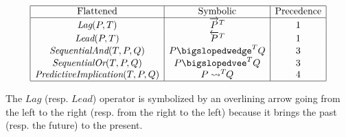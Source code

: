 \documentclass[runningheads]{llncs}
\newcommand{\SP}{\;\;\;}
\newcommand{\TEval}{\textit{Evaluation}}
\newcommand{\TList}{\textit{List}}
\newcommand{\TLamb}{\textit{Lambda}}
\newcommand{\TExec}{\textit{Execution}}
\newcommand{\TAtTime}{\textit{AtTime}}
\newcommand{\TAnd}{\textit{And}}
\newcommand{\TOr}{\textit{Or}}
\newcommand{\TImpl}{\textit{Implication}}
\newcommand{\TPredImpl}{\textit{PredictiveImplication}}
\newcommand{\TSeqAnd}{\textit{SequentialAnd}}
\newcommand{\TSeqOr}{\textit{SequentialOr}}
\newcommand{\TLag}{\textit{Lag}}
\newcommand{\TLead}{\textit{Lead}}
\newcommand{\TTV}{\textit{TV}}
\newcommand{\TBTV}{\langle \TTV \rangle}
\newcommand{\limp}{\rightarrow}
\newcommand{\lpreimp}[1]{\leadsto^{#1}}
\newcommand{\lseqor}[1]{\bigslopedvee^{#1}}
\newcommand{\lseqand}[1]{\bigslopedwedge^{#1}}
\newcommand{\ldo}[1]{\widehat{#1}}
\newcommand{\llag}[2]{\overrightarrow{#1}^{#2}}
\newcommand{\llead}[2]{\overleftarrow{#1}^{#2}}
\begin{document}
\renewcommand{\arraystretch}{1.5}
$$
\begin{array}{|c|c|c|}
  \hline
  \text{Flattened} & \text{Symbolic} & \text{Precedence} \\
  \hline
  \TLag(P, T) & \llag{P}{T} & 1 \\
  \TLead(P, T) & \llead{P}{T} & 1 \\
  \TSeqAnd(T, P, Q) & P \lseqand{T} Q & 3 \\
  \TSeqOr(T, P, Q) & P \lseqor{T} Q & 3 \\
  \TPredImpl(T, P, Q) & P \lpreimp{T} \! \! Q & 4 \\
  \hline
\end{array}
$$
\renewcommand{\arraystretch}{1}

The $\TLag$ (resp. $\TLead$) operator is symbolized by an overlining
arrow going from the left to the right (resp. from the right to the
left) because it brings the past (resp. the future) to the present.




\end{document}
